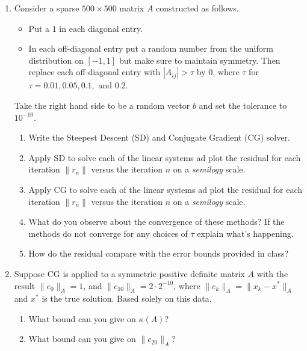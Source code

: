 \documentclass[a4paper,12pt]{article}
\newcommand{\abs}[1]{\left| #1 \right|}
\newcommand{\norm}[1]{\lVert #1 \rVert}
\begin{document}
\begin{enumerate}[label = \arabic*)]
	\item Consider a sparse $ 500 \times 500 $ matrix $ A $ constructed as follows.
	\begin{itemize}[topsep = 0pt]
		\item Put a $ 1 $ in each diagonal entry.
		\item In each off-diagonal entry put a random number from the uniform distribution on $ [-1,1] $ but make sure to maintain symmetry. Then replace each off-diagonal entry with $ \abs{A_{ij}} > \tau $ by $ 0 $, where $ \tau $ for $ \tau = 0.01, 0.05, 0.1, $ and $ 0.2 $.
	
	\end{itemize}
		
	Take the right hand side to be a random vector $ b $ and set the tolerance to $ 10^{-10} $.
	\begin{enumerate}[label = (\alph*)]
		\item Write the Steepest Descent (SD) and Conjugate Gradient (CG) solver.
		
		\item Apply SD to solve each of the linear systems ad plot the residual for each iteration $ \norm{r_n} $ versus the iteration $ n $ on a \emph{semilogy} scale. 
		
		\item Apply CG to solve each of the linear systems ad plot the residual for each iteration $ \norm{r_n} $ versus the iteration $ n $ on a \emph{semilogy} scale. 
		
		\item What do you observe about the convergence of these methods? If the methods do not converge for any choices of $ \tau $ explain what's happening.
		
		\item How do the residual compare with the error bounds provided in class?
	\end{enumerate}

	\item Suppose CG is applied to a symmetric positive definite matrix $ A $ with the result $ \norm{e_0}_A = 1 $, and $ \norm{e_{10}}_A = 2 \cdot 2^{-10} $, where $ \norm{e_k}_A = \norm{x_k - x^*}_A $ and $ x^* $ is the true solution. Based solely on this data,
	\begin{enumerate}[label = (\alph*)]
		\item What bound can you give on $ \kappa(A) $?
		\item What bound can you give on $ \norm{e_{20}}_A $?
	\end{enumerate}


\end{enumerate}
\end{document}
